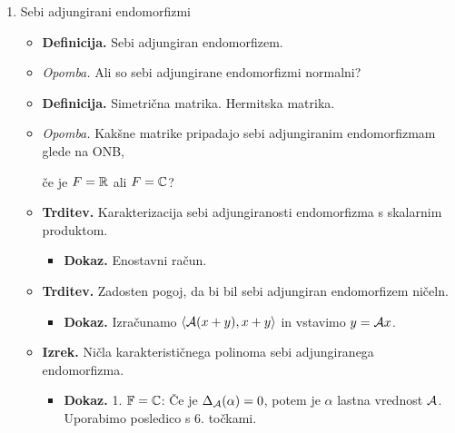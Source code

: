 \begin{enumerate}
\begin{itemize}
        (2) Zadosten pogoj za diagonalizacijo v ONB, če je $\FF = \RR$.
        \begin{itemize}
            \item \colorbox{green!30}{\textbf{Dokaz.}} Obe točki hkrati z indukcijo na $\dim V$.
            
            Najdemo en lastni vektor $v_1$ in pokažemo, da podprostor $v_1^\perp$ invarianten za $\Aa$ in uporabimo i.p.
        \end{itemize}
        \item \colorbox{orange!30}{\textbf{Posledica.}} Karakterizacija normalnosti matrike.
        \item \colorbox{blue!30}{\textbf{Izrek.}} Schurov izrek.
        \begin{itemize}
            \item \colorbox{green!30}{\textbf{Ideja dokaz.}} Poiščemo Jordanovo bazo in na njej uporabimo Gram-Scmidtov postopek.
        \end{itemize}
    \end{itemize}

    \newpage
    \item Sebi adjungirani endomorfizmi
    \begin{itemize}
        \item \colorbox{purple!30}{\textbf{Definicija.}} Sebi adjungiran endomorfizem.
        \item \colorbox{yellow!30}{\emph{Opomba.}} Ali so sebi adjungirane endomorfizmi normalni?
        \item \colorbox{purple!30}{\textbf{Definicija.}} Simetrična matrika. Hermitska matrika.
        \item \colorbox{yellow!30}{\emph{Opomba.}} Kakšne matrike pripadajo sebi adjungiranim endomorfizmam glede na ONB, 
        
        če je $F = \mathbb{R}$ ali $F = \mathbb{C}$?
        \item \colorbox{blue!30}{\textbf{Trditev.}} Karakterizacija sebi adjungiranosti endomorfizma s skalarnim produktom.
        \begin{itemize}
            \item \colorbox{green!30}{\textbf{Dokaz.}} Enostavni račun.
        \end{itemize}
        \item \colorbox{blue!30}{\textbf{Trditev.}} Zadosten pogoj, da bi bil sebi adjungiran endomorfizem ničeln.
        \begin{itemize}
            \item \colorbox{green!30}{\textbf{Dokaz.}} Izračunamo $\left\langle \mathcal{A}(x+y), x+y\right\rangle $ in vstavimo $y = \mathcal{A} x$.
        \end{itemize}
        \item \colorbox{blue!30}{\textbf{Izrek.}} Ničla karakterističnega polinoma sebi adjungiranega endomorfizma.
        \begin{itemize}
            \item \colorbox{green!30}{\textbf{Dokaz.}} 1. $\mathbb{F} = \mathbb{C}$: Če je $\Delta_{\mathcal{A}}(\alpha) = 0$, potem je $\alpha$ lastna vrednost $\Aa$. Uporabimo posledico s 6. točkami.
            

\end{itemize}
\end{itemize}
\end{enumerate}

